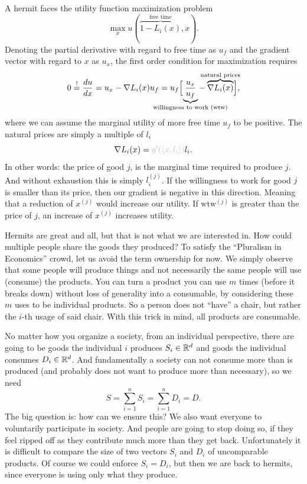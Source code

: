 \begin{example}
	A hermit faces the utility function maximization problem
	\[
		\max_{x} u(\overbrace{1-L_i(x)}^{\text{free time}}, x).
	\]
	Denoting the partial derivative with regard to free time as \(u_f\) and the
	gradient vector with regard to \(x\) as \(u_x\), the first
	order condition for maximization requires
	\[
		0\overset!=\frac{du}{dx}
		= u_x - \nabla L_i(x) u_f
		= u_f \Bigl[
			\underbrace{\frac{u_x}{u_f}}_{\mathclap{\text{willingness to work (wtw)}}}
		- \overbrace{\nabla L_i(x)}^{\mathclap{\text{natural prices}}}
		\Bigr],
	\]
	where we can assume the marginal utility of more free time \(u_f\) to be
	positive. The natural prices are simply {\color{lightgray} a multiple of}
	\(l_i\)
	\[
		\nabla L_i(x) = {\color{lightgray} g'(\langle x, l_i\rangle) }l_i.
	\]
	In other words: the price of good \(j\), is the {\color{lightgray} marginal}
	time required to produce \(j\). And without exhaustion this is simply
	\(l^{(j)}_i\). If the willingness to work for good \(j\) is smaller than
	its price, then our gradient is negative in this direction. Meaning that
	a reduction of \(x^{(j)}\) would increase our utility. If \(\text{wtw}^{(j)}\) is
	greater than the price of \(j\), an increase of \(x^{(j)}\) increases utility.
\end{example}

Hermits are great and all, but that is not what we are interested in. How could
multiple people share the goods they produced? To satisfy the ``Pluralism in
Economics'' crowd, let us avoid the term ownership for now. We simply observe
that some people will produce things and not necessarily the same people will
use (consume) the products. You can turn a product you can use \(m\) times
(before it breaks down) without loss of generality into a consumable, by
considering these \(m\) uses to be individual products. So a person does not
``have'' a chair, but rather the \(i\)-th usage of said chair. With this trick
in mind, all products are consumable.

No matter how you organize a society, from an individual perspective, there
are going to be goods the individual \(i\) produces \(S_i\in\mathbb{R}^d\) and
goods the individual consumes \(D_i\in\mathbb{R}^d\). And fundamentally a
society can not consume more than is produced (and probably does not want to
produce more than necessary), so we need
\[
	S = \sum_{i=1}^n S_i = \sum_{i=1}^n D_i = D.
\]
The big question is: how can we ensure this? We also want everyone to
voluntarily participate in society. And people are going to stop doing so, if
they feel ripped off as they contribute much more than they get back.
Unfortunately it is difficult to compare the size of two vectors \(S_i\) and
\(D_i\) of uncomparable products. Of course we could enforce \(S_i=D_i\), but
then we are back to hermits, since everyone is using only what they produce.

